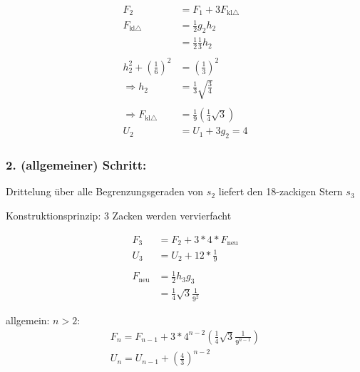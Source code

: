 \begin{center}
\end{center}

\begin{align*}
    F_2 &= F_1 + 3 F_{\text{kl} \triangle} \\
    F_{\text{kl} \triangle} &= \frac{1}{2} g_2 h_2 \\
    &= \frac{1}{2} \frac{1}{3} h_2 \\
\\
    h_2^2 + \left( \frac{1}{6} \right)^2 &= \left( \frac{1}{3} \right)^2 \\
    \Rightarrow h_2 &= \frac{1}{3} \sqrt{ \frac{3}{4} } \\
\\
    \Rightarrow F_{\text{kl} \triangle} &= \frac{1}{9} \left( \frac{1}{4} \sqrt{3} \right)
\\
    U_2 &= U_1 + 3 g_2 = 4
\end{align*}

\subsubsection*{2. (allgemeiner) Schritt:}
Drittelung über alle Begrenzungsgeraden von $s_2$ liefert den 18-zackigen Stern $s_3$

\begin{center}
\end{center}


Konstruktionsprinzip: 3 Zacken werden vervierfacht

\begin{align*}
    F_3 &= F_2 + 3*4*F_{\text{neu}} \\
    U_3 &= U_2 + 12 * \frac{1}{9} \\
\\
    F_{\text{neu}} &= \frac{1}{2} h_3 g_3 \\
    &= \frac{1}{4} \sqrt{3} \frac{1}{9^2}
\end{align*}

allgemein:
$n > 2$:
\begin{align*}
    F_n = F_{n-1} + 3 * 4^{n-2} \left( \frac{1}{4} \sqrt{3} \frac{1}{9^{n-1}} \right) \\
    U_n = U_{n-1} + \left( \frac{4}{3} \right)^{n-2}
\end{align*}

